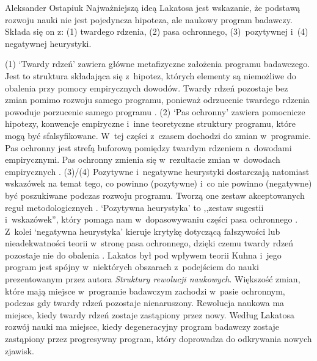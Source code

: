 \begin{artplenv}{Aleksander Ostapiuk}
Najważniejszą ideą Lakatosa jest wskazanie, że podstawą rozwoju nauki nie jest pojedyncza hipoteza, ale naukowy program
badawczy. Składa się on z: (1) twardego rdzenia, (2) pasa ochronnego, (3)~pozytywnej i~(4) negatywnej heurystyki. 

(1) `Twardy rdzeń' zawiera główne metafizyczne założenia programu badawczego. Jest to struktura składająca
się z~hipotez, których elementy są niemożliwe do obalenia przy pomocy empirycznych dowodów. Twardy rdzeń pozostaje bez zmian
pomimo rozwoju samego programu, ponieważ odrzucenie twardego rdzenia powoduje porzucenie samego programu
\parencite[s.~122]{hands_reflection_2001}.
(2) `Pas ochronny' zawiera pomocnicze hipotezy, konwencje
empiryczne i~inne teoretyczne struktury programu, które mogą być sfalsyfikowane. W~tej części z~czasem dochodzi do
zmian w~programie. Pas ochronny jest strefą buforową pomiędzy twardym rdzeniem a~dowodami empirycznymi. Pas ochronny zmienia
się w~rezultacie zmian w~dowodach empirycznych
\parencite[s.~122]{hands_reflection_2001}.
(3)/(4)
Pozytywne i~negatywne heurystyki dostarczają natomiast wskazówek na temat tego, co powinno (pozytywne) i~co nie powinno (negatywne)
być poszukiwane podczas rozwoju programu. Tworzą one zestaw akceptowanych reguł metodologicznych
\parencite[s.~47]{lakatos_falsification_1970}.
`Pozytywna heurystyka' to ,,zestaw sugestii i~wskazówek'', który pomaga
nam w~dopasowywaniu części pasa ochronnego
\parencite[s.~50]{lakatos_falsification_1970}.
Z~kolei `negatywna
heurystyka' kieruje krytykę dotyczącą fałszywości lub nieadekwatności teorii w~stronę pasa ochronnego, dzięki czemu
twardy rdzeń pozostaje nie do obalenia
\parencite[s.~48–50]{lakatos_falsification_1970}.
Lakatos był pod wpływem
teorii Kuhna
\parencite*{kuhn_structure_1962}
i~jego program jest spójny w~niektórych obszarach z~podejściem do nauki
prezentowanym przez autora \textit{Struktury rewolucji naukowych}. Większość zmian, które mają miejsce w~programie
badawczym zachodzi w~pasie ochronnym, podczas gdy twardy rdzeń pozostaje nienaruszony. Rewolucja naukowa ma miejsce,
kiedy twardy rdzeń zostaje zastąpiony przez nowy. Według Lakatosa rozwój nauki ma miejsce, kiedy degeneracyjny program
badawczy zostaje zastąpiony przez progresywny program, który doprowadza do odkrywania nowych zjawisk.


\end{artplenv}
